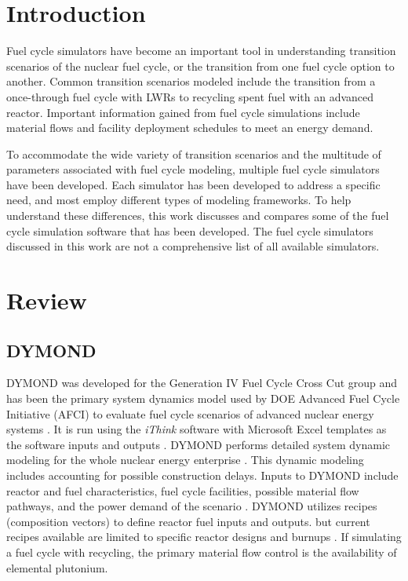 \documentclass{article}
\begin{document}
\section{Introduction}
    Fuel cycle simulators have become an important tool in understanding 
    transition scenarios of the nuclear fuel cycle, or the transition 
    from one fuel cycle option to another. Common transition scenarios 
    modeled include the transition from a once-through fuel cycle with 
    \glspl{LWR} to recycling spent fuel with an advanced reactor. Important 
    information gained from fuel cycle simulations include material 
    flows and facility deployment schedules to meet an energy demand. 

    To accommodate the wide variety of transition scenarios and the multitude
    of parameters associated with fuel cycle modeling, multiple fuel 
    cycle simulators have been developed. Each simulator has been developed 
    to address a specific need, and most employ different types of modeling 
    frameworks. To help understand these differences, this work discusses 
    and compares some of the fuel cycle simulation 
    software that has been developed. The fuel cycle simulators 
    discussed in this work are not a comprehensive list of all available 
    simulators. 
    

\section{Review}
\subsection{DYMOND}
    \gls{DYMOND} was developed for the Generation IV Fuel Cycle Cross Cut 
    group and has been the primary 
    system dynamics model used by \gls{DOE} Advanced Fuel Cycle Initiative (AFCI)
    to evaluate fuel cycle scenarios of 
    advanced nuclear energy systems \cite{yacout_visionverifiable_2006}.
    It is run using the \textit{iThink} software with Microsoft Excel 
    templates as the software inputs and outputs \cite{feng_standardized_2016}.
    \gls{DYMOND} performs detailed system dynamic modeling for the whole nuclear 
    energy enterprise \cite{yacout_visionverifiable_2006}. This dynamic modeling includes 
    accounting for possible construction delays. 
    Inputs to DYMOND include reactor and fuel characteristics, fuel cycle
    facilities, possible material flow pathways, and the power demand of the 
    scenario \cite{feng_standardized_2016}. 
    \gls{DYMOND} utilizes recipes (composition vectors) to define reactor fuel 
    inputs and outputs. but current recipes available are limited 
    to specific reactor designs and burnups \cite{yacout_visionverifiable_2006}.
    If simulating a fuel cycle with recycling, the primary material flow control 
    is the availability of elemental plutonium.
\end{document}
